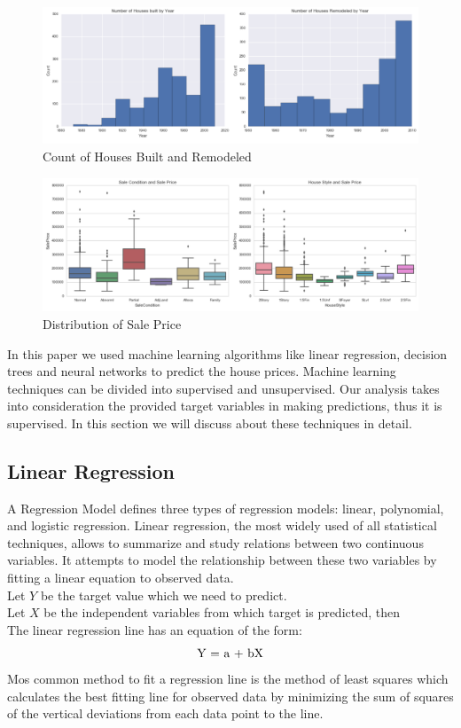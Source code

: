 \documentclass[fleqn,10pt]{SelfArx} %
\begin{document}
	\begin{figure}[ht]\centering %
		\includegraphics[width=\linewidth]{year}
		\caption{Count of Houses Built and Remodeled}
		\label{fig:year}
	\end{figure}
	\begin{figure}[ht]\centering %
		\includegraphics[width=\linewidth]{SalePrice}
		\caption{Distribution of Sale Price}
		\label{fig:SalePrice}
	\end{figure}
	
	In this paper we used machine learning algorithms like linear regression, decision trees and neural networks to predict the house prices. Machine learning techniques can be divided into supervised and unsupervised. Our analysis takes into consideration the provided target variables in making predictions, thus it is supervised. In this section we will discuss about these techniques in detail.
	\subsection{Linear Regression}
	A Regression Model defines three types of regression models: linear, polynomial, and logistic regression. Linear regression, the most widely used of all statistical techniques, allows to summarize and study relations between two continuous variables\cite{stat}. It attempts to model the relationship between these two variables by fitting a linear equation to observed data. \\
	Let $Y$ be the target value which we need to predict.\\
	Let $X$ be the independent variables from which target is predicted, then\\
	The linear regression line has an equation of the form:
	\[ $Y = a + bX$\]
	Mos common method to fit a regression line is the method of least squares which calculates the best fitting line for observed data by minimizing the sum of squares of the vertical deviations from each data point to the line. 
	
\end{document}
